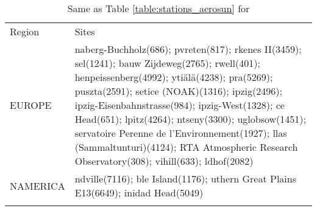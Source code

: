 \documentclass[journal abbreviation, manuscript]{copernicus}
\begin{document}
\clearpage

\begin{table}
 \tiny
 \begin{tabularx}{\textwidth}{lX}
  \tophline
  Region   & Sites                                                                                                                                                                                                                                                                                                                                                                                                                                                                                                                                                                                                                                                                                                                                                                                                                                                               \\
\middlehline
   EUROPE &  naberg-Buchholz(686); pvreten(817); rkenes II(3459); sel(1241); bauw Zijdeweg(2765); rwell(401); henpeissenberg(4992); ytiälä(4238); pra(5269); puszta(2591); setice (NOAK)(1316); ipzig(2496); ipzig-Eisenbahnstrasse(984); ipzig-West(1328); ce Head(651); lpitz(4264); ntseny(3300); uglobsow(1451); servatoire Perenne de l'Environnement(1927); llas (Sammaltunturi)(4124); RTA Atmospheric Research Observatory(308); vihill(633); ldhof(2082) \\
 NAMERICA &                                                                                                                                                                                                                                                                                                                                                                     ndville(7116); ble Island(1176); uthern Great Plains E13(6649); inidad Head(5049) \\
\bottomhline
 \end{tabularx}
 \caption{Same as Table \ref{table:stations_aerosun} for }
 \label{table:stations_abs}
\end{table}
\end{document}

